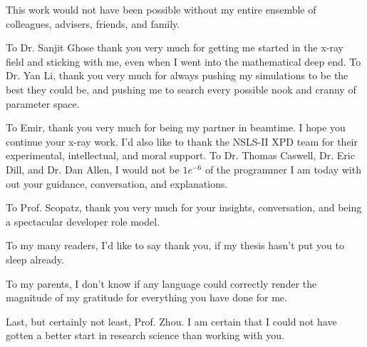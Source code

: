 This work would not have been possible without my entire ensemble of colleagues, advisers, friends, and family.

To Dr. Sanjit Ghose thank you very much for getting me started in the x-ray field and sticking with me, even when I went into the mathematical deep end.
To Dr. Yan Li, thank you very much for always pushing my simulations to be the best they could be, and pushing me to search every possible nook and cranny of parameter space.

To Emir, thank you very much for being my partner in beamtime. I hope you continue your x-ray work.
I'd also like to thank the NSLS-II XPD team for their experimental, intellectual, and moral support.
To Dr. Thomas Caswell, Dr. Eric Dill, and Dr. Dan Allen, I would not be $1e^{-6}$ of the programmer I am today with out your guidance, conversation, and explanations.

To Prof. Scopatz, thank you very much for your insights, conversation, and being a spectacular developer role model.

To my many readers, I'd like to say thank you, if my thesis hasn't put you to sleep already.

To my parents, I don't know if any language could correctly render the magnitude of my gratitude for everything you have done for me.

Last, but certainly not least, Prof. Zhou.
I am certain that I could not have gotten a better start in research science than working with you.
